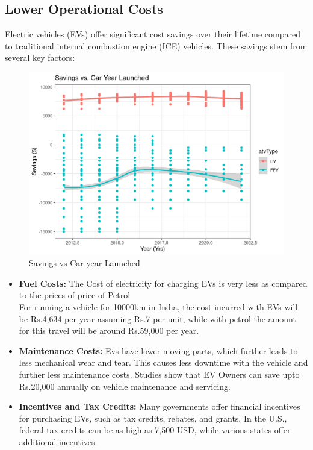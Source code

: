 \documentclass[a4paper,12pt]{report}
\begin{document}
\subsection{Lower Operational Costs}
Electric vehicles (EVs) offer significant cost savings over their lifetime compared to traditional internal combustion engine (ICE) vehicles. These savings stem from several key factors:
    \begin{figure}
        \centering
        \includegraphics[width=0.8\linewidth]{image.png}
        \caption{Savings vs Car year Launched\cite{rpubs}}
        \label{fig:enter-label}
    \end{figure}


\begin{itemize}
    \item \textbf{Fuel Costs: } The Cost of electricity for charging EVs is very less as compared to the prices of price of Petrol 
    \\ For running a vehicle for 10000km in India, the cost incurred with EVs will be Rs.4,634 per year assuming Rs.7 per unit, while with petrol the amount for this travel will be around Rs.59,000 per year.
    \item \textbf{Maintenance Costs:}
    Evs have lower moving parts, which further leads to less mechanical wear and tear. This causes less downtime with the vehicle and further less maintenance costs. 
    Studies show that EV Owners can save upto Rs.20,000 annually on vehicle maintenance and servicing.
    \item \textbf{Incentives and Tax Credits:}
    Many governments offer financial incentives for purchasing EVs, such as tax credits, rebates, and grants. In the U.S., federal tax credits can be as high as 7,500 USD, while various states offer additional incentives.
\end{itemize}
\end{document}
